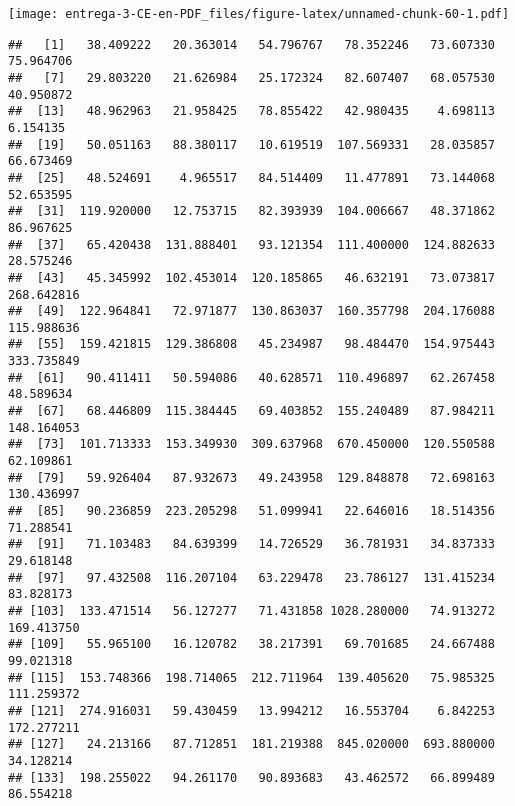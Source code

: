 \documentclass[
]{article}
\newenvironment{Shaded}{\begin{snugshade}}{\end{snugshade}}
\newcommand{\DataTypeTok}[1]{\textcolor[rgb]{0.13,0.29,0.53}{#1}}
\newcommand{\DecValTok}[1]{\textcolor[rgb]{0.00,0.00,0.81}{#1}}
\newcommand{\KeywordTok}[1]{\textcolor[rgb]{0.13,0.29,0.53}{\textbf{#1}}}
\newcommand{\NormalTok}[1]{#1}
\newcommand{\OperatorTok}[1]{\textcolor[rgb]{0.81,0.36,0.00}{\textbf{#1}}}
\newcommand{\StringTok}[1]{\textcolor[rgb]{0.31,0.60,0.02}{#1}}
\begin{document}
\texttt{[image: entrega-3-CE-en-PDF\_files/figure-latex/unnamed-chunk-60-1.pdf]}

\begin{Shaded}
\end{Shaded}

\begin{verbatim}
##   [1]   38.409222   20.363014   54.796767   78.352246   73.607330   75.964706
##   [7]   29.803220   21.626984   25.172324   82.607407   68.057530   40.950872
##  [13]   48.962963   21.958425   78.855422   42.980435    4.698113    6.154135
##  [19]   50.051163   88.380117   10.619519  107.569331   28.035857   66.673469
##  [25]   48.524691    4.965517   84.514409   11.477891   73.144068   52.653595
##  [31]  119.920000   12.753715   82.393939  104.006667   48.371862   86.967625
##  [37]   65.420438  131.888401   93.121354  111.400000  124.882633   28.575246
##  [43]   45.345992  102.453014  120.185865   46.632191   73.073817  268.642816
##  [49]  122.964841   72.971877  130.863037  160.357798  204.176088  115.988636
##  [55]  159.421815  129.386808   45.234987   98.484470  154.975443  333.735849
##  [61]   90.411411   50.594086   40.628571  110.496897   62.267458   48.589634
##  [67]   68.446809  115.384445   69.403852  155.240489   87.984211  148.164053
##  [73]  101.713333  153.349930  309.637968  670.450000  120.550588   62.109861
##  [79]   59.926404   87.932673   49.243958  129.848878   72.698163  130.436997
##  [85]   90.236859  223.205298   51.099941   22.646016   18.514356   71.288541
##  [91]   71.103483   84.639399   14.726529   36.781931   34.837333   29.618148
##  [97]   97.432508  116.207104   63.229478   23.786127  131.415234   83.828173
## [103]  133.471514   56.127277   71.431858 1028.280000   74.913272  169.413750
## [109]   55.965100   16.120782   38.217391   69.701685   24.667488   99.021318
## [115]  153.748366  198.714065  212.711964  139.405620   75.985325  111.259372
## [121]  274.916031   59.430459   13.994212   16.553704    6.842253  172.277211
## [127]   24.213166   87.712851  181.219388  845.020000  693.880000   34.128214
## [133]  198.255022   94.261170   90.893683   43.462572   66.899489   86.554218

\end{verbatim}
\end{document}

